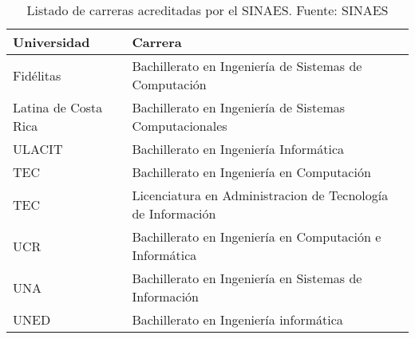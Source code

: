 \begin{table}[h!]
    \footnotesize
    \begin{tabular}{ll}
        \toprule[1.5pt]
        \textbf{Universidad} & \textbf{Carrera}\\
        \midrule
        Fidélitas & Bachillerato en Ingeniería de Sistemas de Computación \\
        Latina de Costa Rica & Bachillerato en Ingeniería de Sistemas Computacionales \\
        ULACIT & Bachillerato en Ingeniería Informática \\
        TEC & Bachillerato en Ingeniería en Computación \\
        TEC & Licenciatura en Administracion de Tecnología de Información \\
        UCR & Bachillerato en Ingeniería en Computación e Informática \\
        UNA & Bachillerato en Ingeniería en Sistemas de Información \\
        UNED & Bachillerato en Ingeniería informática \\
        \bottomrule[1.5pt]  
    \end{tabular}
    \caption{Listado de carreras acreditadas por el SINAES. Fuente: SINAES}
    \label{table:listado-sinaes}
\end{table}
 
